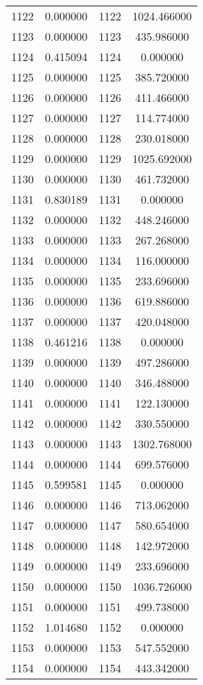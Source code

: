 \documentclass[12pt]{article}
\begin{document}
\begin{longtable}{@{}cccc@{}}
1122 & 0.000000 & 1122 & 1024.466000 \\
1123 & 0.000000 & 1123 & 435.986000 \\
1124 & 0.415094 & 1124 & 0.000000 \\
1125 & 0.000000 & 1125 & 385.720000 \\
1126 & 0.000000 & 1126 & 411.466000 \\
1127 & 0.000000 & 1127 & 114.774000 \\
1128 & 0.000000 & 1128 & 230.018000 \\
1129 & 0.000000 & 1129 & 1025.692000 \\
1130 & 0.000000 & 1130 & 461.732000 \\
1131 & 0.830189 & 1131 & 0.000000 \\
1132 & 0.000000 & 1132 & 448.246000 \\
1133 & 0.000000 & 1133 & 267.268000 \\
1134 & 0.000000 & 1134 & 116.000000 \\
1135 & 0.000000 & 1135 & 233.696000 \\
1136 & 0.000000 & 1136 & 619.886000 \\
1137 & 0.000000 & 1137 & 420.048000 \\
1138 & 0.461216 & 1138 & 0.000000 \\
1139 & 0.000000 & 1139 & 497.286000 \\
1140 & 0.000000 & 1140 & 346.488000 \\
1141 & 0.000000 & 1141 & 122.130000 \\
1142 & 0.000000 & 1142 & 330.550000 \\
1143 & 0.000000 & 1143 & 1302.768000 \\
1144 & 0.000000 & 1144 & 699.576000 \\
1145 & 0.599581 & 1145 & 0.000000 \\
1146 & 0.000000 & 1146 & 713.062000 \\
1147 & 0.000000 & 1147 & 580.654000 \\
1148 & 0.000000 & 1148 & 142.972000 \\
1149 & 0.000000 & 1149 & 233.696000 \\
1150 & 0.000000 & 1150 & 1036.726000 \\
1151 & 0.000000 & 1151 & 499.738000 \\
1152 & 1.014680 & 1152 & 0.000000 \\
1153 & 0.000000 & 1153 & 547.552000 \\
1154 & 0.000000 & 1154 & 443.342000 \\

\end{longtable}
\end{document}
